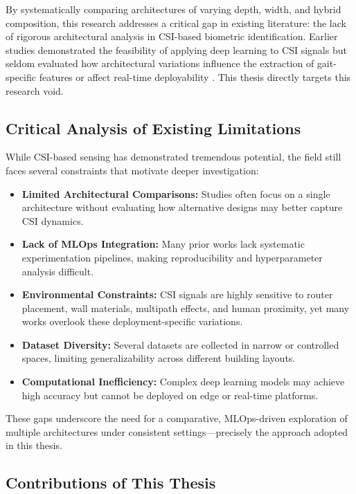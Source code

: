 By systematically comparing architectures of varying depth, width, and hybrid composition, this research addresses a critical gap in existing literature: the lack of rigorous architectural analysis in CSI-based biometric identification. Earlier studies demonstrated the feasibility of applying deep learning to CSI signals but seldom evaluated how architectural variations influence the extraction of gait-specific features or affect real-time deployability \parencite{wang2019csiid}. This thesis directly targets this research void.

\subsection{Critical Analysis of Existing Limitations}

While CSI-based sensing has demonstrated tremendous potential, the field still faces several constraints that motivate deeper investigation:

\begin{itemize}
    \item \textbf{Limited Architectural Comparisons:} Studies often focus on a single architecture without evaluating how alternative designs may better capture CSI dynamics.
    \item \textbf{Lack of MLOps Integration:} Many prior works lack systematic experimentation pipelines, making reproducibility and hyperparameter analysis difficult.
    \item \textbf{Environmental Constraints:} CSI signals are highly sensitive to router placement, wall materials, multipath effects, and human proximity, yet many works overlook these deployment-specific variations.
    \item \textbf{Dataset Diversity:} Several datasets are collected in narrow or controlled spaces, limiting generalizability across different building layouts.
    \item \textbf{Computational Inefficiency:} Complex deep learning models may achieve high accuracy but cannot be deployed on edge or real-time platforms.
\end{itemize}

These gaps underscore the need for a comparative, MLOps-driven exploration of multiple architectures under consistent settings—precisely the approach adopted in this thesis.

\subsection{Contributions of This Thesis}

